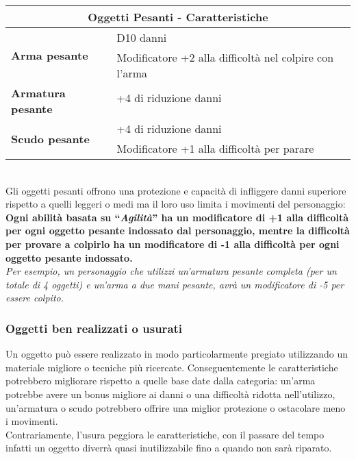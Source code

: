 \documentclass[../manuale_main.tex]{subfiles}
\begin{document}
\renewcommand{\arraystretch}{1.2}
\begin{tabular}{|l l| }
\hline
\multicolumn{2}{|c|}{\textbf{Oggetti Pesanti - Caratteristiche}}\\
\hline
\hline
\multirow{2}{8em}{\textbf{Arma pesante}}&D10 danni \\&Modificatore +2 alla difficoltà nel colpire con l'arma\\
\hline

\multirow{2}{8em}{\textbf{Armatura pesante}}&+4 di riduzione danni\\&\\
\hline

\multirow{2}{8em}{\textbf{Scudo pesante}}&+4 di riduzione danni\\&Modificatore +1 alla difficoltà per parare\\
\hline
\end{tabular}
\mbox{}\\

Gli oggetti pesanti offrono una protezione e capacità di infliggere danni superiore rispetto a quelli leggeri o medi ma il loro uso limita i movimenti del personaggio:\\
\textbf{Ogni abilità basata su ``\emph{Agilità}'' ha un modificatore di +1 alla difficoltà per ogni oggetto pesante indossato dal personaggio, mentre la difficoltà per provare a colpirlo ha un modificatore di -1 alla difficoltà per ogni oggetto pesante indossato.}\\
\textit{Per esempio, un personaggio che utilizzi un'armatura pesante completa (per un totale di 4 oggetti) e un'arma a due mani pesante, avrà un modificatore di -5 per essere colpito.}


\subsubsection{Oggetti ben realizzati o usurati}

Un oggetto può essere realizzato in modo particolarmente pregiato utilizzando un materiale migliore o tecniche più ricercate. Conseguentemente le caratteristiche potrebbero migliorare rispetto a quelle base date dalla categoria: un'arma potrebbe avere un bonus migliore ai danni o una difficoltà ridotta nell'utilizzo, un'armatura o scudo potrebbero offrire una miglior protezione o ostacolare meno i movimenti.\\
Contrariamente, l'usura peggiora le caratteristiche, con il passare del tempo infatti un oggetto diverrà quasi inutilizzabile fino a quando non sarà riparato.
\end{document}
